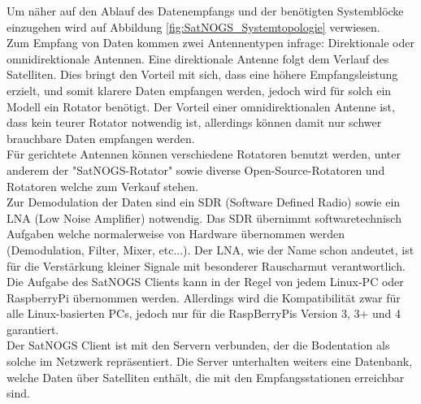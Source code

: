 Um näher auf den Ablauf des Datenempfangs und der benötigten Systemblöcke einzugehen wird auf Abbildung \ref{fig:SatNOGS_Systemtopologie} verwiesen.\\
\newline
Zum Empfang von Daten kommen zwei Antennentypen infrage: Direktionale oder omnidirektionale Antennen. Eine direktionale Antenne folgt dem Verlauf des Satelliten. Dies bringt den Vorteil mit sich, dass eine höhere Empfangsleistung erzielt, und somit klarere Daten empfangen werden, jedoch wird für solch ein Modell ein Rotator benötigt. Der Vorteil einer omnidirektionalen Antenne ist, dass kein teurer Rotator notwendig ist, allerdings können damit nur schwer brauchbare Daten empfangen werden.\\
\newline
Für gerichtete Antennen können verschiedene Rotatoren benutzt werden, unter anderem der "SatNOGS-Rotator" sowie diverse Open-Source-Rotatoren und Rotatoren welche zum Verkauf stehen.\\
\newline
Zur Demodulation der Daten sind ein SDR (Software Defined Radio) sowie ein LNA (Low Noise Amplifier) notwendig. Das SDR übernimmt softwaretechnisch Aufgaben welche normalerweise von Hardware übernommen werden (Demodulation, Filter, Mixer, etc...). Der LNA, wie der Name schon andeutet, ist für die Verstärkung kleiner Signale mit besonderer Rauscharmut verantwortlich. \\
\newline
Die Aufgabe des SatNOGS Clients kann in der Regel von jedem Linux-PC oder RaspberryPi übernommen werden. Allerdings wird die Kompatibilität zwar für alle Linux-basierten PCs, jedoch nur für die RaspBerryPis Version 3, 3+ und 4 garantiert.\\
\newline
Der SatNOGS Client ist mit den Servern verbunden, der die Bodentation als solche im Netzwerk repräsentiert. Die Server unterhalten weiters eine Datenbank, welche Daten über Satelliten enthält, die mit den Empfangsstationen erreichbar sind.
\pagebreak